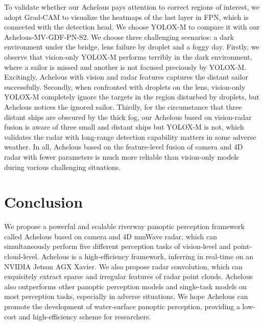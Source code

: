 \documentclass[letterpaper, 10 pt, conference]{ieeeconf}
\begin{document}
To validate whether our Achelous pays attention to correct regions of interest, we adopt Grad-CAM \cite{selvaraju2017grad} to visualize the heatmaps of the last layer in FPN, which is connected with the detection head. We choose YOLOX-M to compare it with our Achelous-MV-GDF-PN-S2. We choose three challenging scenarios: a dark environment under the bridge, lens failure by droplet and a foggy day. Firstly, we observe that vision-only YOLOX-M performs terribly in the dark environment, where a sailor is missed and another is not focused preciously by YOLOX-M. Excitingly, Achelous with vision and radar features captures the distant sailor successfully. Secondly, when confronted with droplets on the lens, vision-only YOLOX-M completely ignore the targets in the region disturbed by droplets, but Achelous notices the ignored sailor. Thirdly, for the circumstance that three distant ships are obscured by the thick fog, our Achelous based on vision-radar fusion is aware of three small and distant ships but YOLOX-M is not, which validates the radar with long-range detection capability matters in some adverse weather. In all, Achelous based on the feature-level fusion of camera and 4D radar with fewer parameters is much more reliable than vision-only models during various challenging situations.

\section{Conclusion}
We propose a powerful and scalable riverway panoptic perception framework called Achelous based on camera and 4D mmWave radar, which can simultaneously perform five different perception tasks of vision-level and point-cloud-level. Achelous is a high-efficiency framework, inferring in real-time on an NVIDIA Jetson AGX Xavier. We also propose radar convolution, which can exquisitely extract sparse and irregular features of radar point clouds. Achelous also outperforms other panoptic perception models and single-task models on most perception tasks, especially in adverse situations. We hope Achelous can promote the development of water-surface panoptic perception, providing a low-cost and high-efficiency scheme for researchers.











\end{document}
